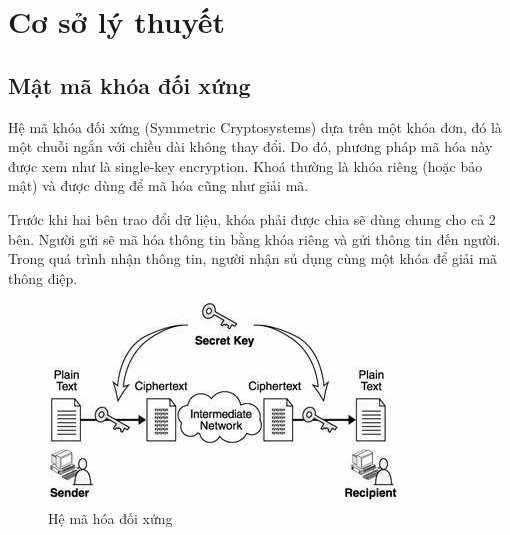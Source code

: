 \documentclass[a4paper,12pt]{report}
\begin{document}
\chapter{Cơ sở lý thuyết}
\section{Mật mã khóa đối xứng}
Hệ mã khóa đối xứng  (Symmetric Cryptosystems) dựa trên một khóa đơn, đó là một chuỗi ngắn với chiều dài không thay đổi. Do đó, phương pháp mã hóa này được xem như là single-key  encryption. Khoá thường là khóa riêng (hoặc bảo mật) và được dùng để mã hóa cũng như giải mã.

Trước khi hai bên trao đổi dữ liệu, khóa phải được chia sẽ dùng chung cho cả 2 bên. Người gửi sẽ mã hóa thông tin bằng khóa riêng và gửi thông tin đến người. Trong quá trình nhận thông tin, người nhận sủ dụng cùng một khóa để giải mã thông điệp.

\begin{center}
\begin{figure}[H]
\centering 
\includegraphics[scale=0.8]{../2.jpg}
\caption{Hệ mã hóa đối xứng} \label{sign1}
\end{figure}
\end{center}
\end{document}
